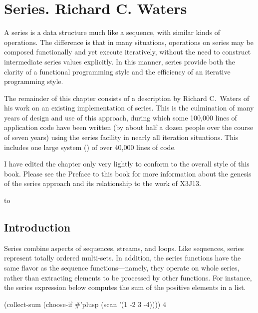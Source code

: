 

\clearpage\def\pagestatus{FINAL PROOF}

\chapter{Series. Richard C. Waters}
\label{SERIES}

\def\SU#1{${}_{#1}$}

\def\fooprime#1{#1'}

\begin{new}
\prefaceword A series is a data structure much like a sequence, with similar
kinds of operations.  The difference is that in many situations, operations
on series may be composed functionally and yet execute iteratively, without
the need to construct intermediate series values explicitly.  In this
manner, series provide both the clarity of a functional programming style
and the efficiency of an iterative programming style.

The remainder of this chapter consists of a description by Richard
C.~Waters of his work on an existing implementation of series.
This is the culmination of many years of design and use of this approach,
during which some 100,000 lines of application code have been written (by
about half a dozen people over the course of seven years) using the series
facility in nearly all iteration situations.  This includes one large
system () of over 40,000 lines of code.

I have edited the chapter only very lightly to conform to the overall style
of this book.  Please see the Preface to this book for more information
about the genesis of the series approach and its relationship to the work
of X3J13.
\end{new}


\noindent\hbox to \textwidth{\hss---Guy L. Steele Jr.}

\section{Introduction}

Series combine aspects of sequences, streams, and loops.  Like sequences,
series represent totally ordered multi-sets.  In addition, the series
functions have the same flavor as the sequence functions---namely, they
operate on whole series, rather than extracting elements to be
processed by other functions.  For instance, the series expression below
computes the sum of the positive elements in a list.
\begin{lisp}
(collect-sum (choose-if \#'plusp (scan '(1 -2 3 -4)))) {\EV} 4
\end{lisp}

